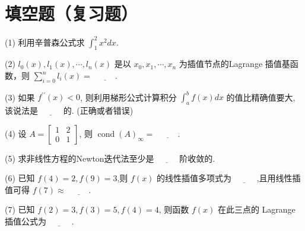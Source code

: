 \clearpage
\section{填空题（复习题）}



  \begin{tcolorbox}[colback=yellow!5!white,colframe=yellow!50!black,
 colbacktitle=yellow!75!black,title=填空题]


 (1) 利用辛普森公式求 $\displaystyle \int_{1}^{2} x^{2} d x $.

\vspace{\baselineskip}

(2) $ l_{0}(x), l_{1}(x), \cdots, l_{n}(x) $ 是以 $ x_{0}, x_{1}, \cdots, x_{n} $ 为插值节点的Lagrange 插值基函数，则 $\displaystyle \sum_{i=0}^{n} l_{i}(x)= $ $\underline{\hspace{1cm}}$.

\vspace{\baselineskip}

(3) 如果 $ f^{\prime \prime}(x)<0 $, 则利用梯形公式计算积分 $\displaystyle \int_{a}^{b} f(x) d x $ 的值比精确值要大, 该说法是 $\underline{\hspace{1cm}}$ 的. (正确或者错误)

\vspace{\baselineskip}

(4) 设 $ A=\left[\begin{array}{ll}1 & 2 \\ 0 & 1\end{array}\right] $, 则 $ \operatorname{cond}(A)_{\infty}= $ $\underline{\hspace{1cm}}$.

\vspace{\baselineskip}

(5) 求非线性方程的Newton迭代法至少是 $\underline{\hspace{1cm}}$ 阶收敛的.

\vspace{\baselineskip}

(6) 已知 $ f(4)=2, f(9)=3 $,则 $ f(x) $ 的线性插值多项式为
$\underline{\hspace{1cm}}$ ,且用线性插值可得 $ f(7) \approx $ $\underline{\hspace{1cm}}$.

\vspace{\baselineskip}

(7) 已知 $ f(2)=3, f(3)=5, f(4)=4 $, 则函数 $ f(x) $ 在此三点的 Lagrange 插值公式为 $\underline{\hspace{1cm}}$ .


\end{tcolorbox}
